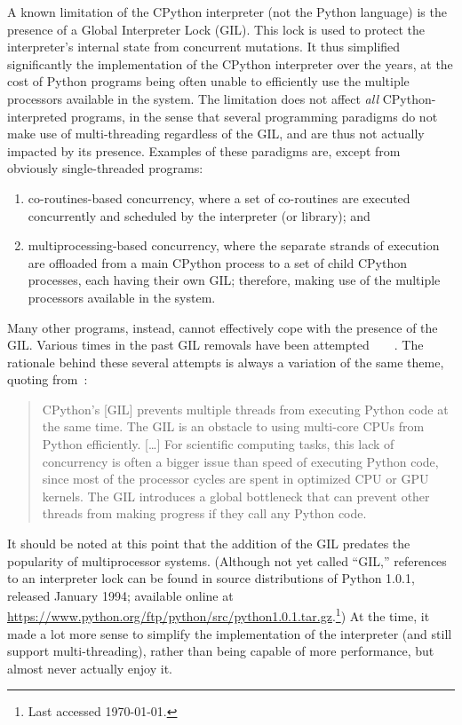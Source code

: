 A known limitation of the CPython interpreter (not the Python language) is the presence of a Global Interpreter Lock (GIL).
This lock is used to protect the interpreter's internal state from concurrent mutations.
It thus simplified significantly the implementation of the CPython interpreter over the years, at the cost of Python programs being often unable to efficiently use the multiple processors available in the system.
The limitation does not affect \emph{all} CPython-interpreted programs, in the sense that several programming paradigms do not make use of multi-threading regardless of the GIL, and are thus not actually impacted by its presence.
Examples of these paradigms are, except from obviously single-threaded programs:
\begin{enumerate}
    \item co-routines-based concurrency, where a set of co-routines are executed concurrently and scheduled by the interpreter (or library); and
    \item multiprocessing-based concurrency, where the separate strands of execution are offloaded from a main CPython process to a set of child CPython processes, each having their own GIL; therefore, making use of the multiple processors available in the system.
\end{enumerate}

Many other programs, instead, cannot effectively cope with the presence of the GIL\@.
Various times in the past GIL removals have been attempted~\cite{dabeaz-gil}~\cite[\S Related Work, Gilectomy]{pep703}~\cite[\S Related Work, PyParallel]{pep703}~\cite[\S Related Work, python-safethread]{pep703}.
The rationale behind these several attempts is always a variation of the same theme, quoting from~\cite{pep703}:
\begin{quote}
    CPython's [GIL] prevents multiple threads from executing Python code at the same time.
    The GIL is an obstacle to using multi-core CPUs from Python efficiently.
    [\ldots] For scientific computing tasks, this lack of concurrency is often a bigger issue than speed of executing Python code, since most of the processor cycles are spent in optimized CPU or GPU kernels.
    The GIL introduces a global bottleneck that can prevent other threads from making progress if they call any Python code.
\end{quote}

It should be noted at this point that the addition of the GIL predates the popularity of multiprocessor systems.
(Although not yet called ``GIL,'' references to an interpreter lock can be found in source distributions of Python 1.0.1, released January 1994; available online at \url{https://www.python.org/ftp/python/src/python1.0.1.tar.gz}.\footnote{Last accessed \today.})
At the time, it made a lot more sense to simplify the implementation of the interpreter (and still support multi-threading), rather than being capable of more performance, but almost never actually enjoy it.

